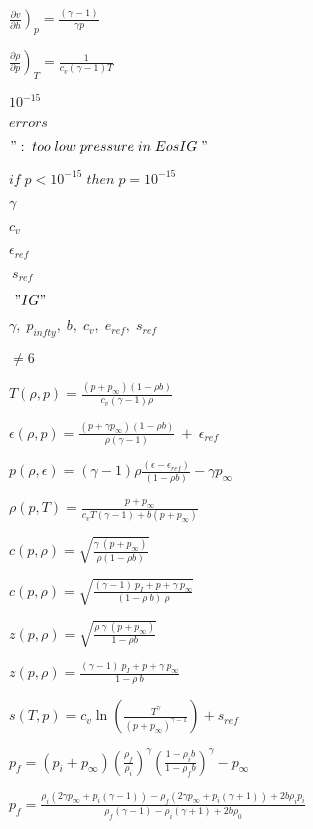 \documentclass{article}
\begin{document}
$ \left. \frac{\partial v}{\partial h} \right)_p =  \frac{(\gamma-1)}{\gamma p} $
\pagebreak

$ \left. \frac{\partial \rho}{\partial p} \right)_T = \frac{1}{c_v (\gamma - 1) T} $
\pagebreak

$ 10^{-15} $
\pagebreak

$ errors $
\pagebreak

$ " :\;too\;low\;pressure \;in\; EosIG\;"$
\pagebreak

$ if \; p < 10^{-15} \; then \;  p= 10^{-15} $
\pagebreak

$ \gamma $
\pagebreak

$ c_v $
\pagebreak

$ \epsilon_{ref} $
\pagebreak

$ \ s_{ref} $
\pagebreak

$ \ "IG" $
\pagebreak

$ \gamma, \; p_{infty}, \; b, \; c_v, \; e_{ref}, \; s_{ref}$
\pagebreak

$ \neq 6$
\pagebreak

$  T(\rho, p) = \frac{(p+p_{\infty})(1-\rho b)}{c_v (\gamma-1)\rho} $
\pagebreak

$  \epsilon (\rho, p)  = \frac{(p + \gamma p_{\infty})(1-\rho b)}{\rho (\gamma-1)} \ + \ \epsilon_{ref} $
\pagebreak

$  p(\rho, \epsilon)  = (\gamma-1)\rho \frac{(\epsilon - \epsilon_{ref})}{(1-\rho b)} - \gamma p_{\infty} $
\pagebreak

$  \rho(p, T)  =  \frac{p + p_{\infty} }{c_v T(\gamma-1) + b (p + p_{\infty})} $
\pagebreak

$  c(p, \rho)  = \sqrt{  \frac{\gamma \ (p+p_{\infty})}{\rho (1-\rho b)}} $
\pagebreak

$  c(p, \rho)  = \sqrt{  \frac{(\gamma-1) \ p_I + p + \gamma \ p_{\infty}}{(1 - \rho \ b) \ \rho}} $
\pagebreak

$  z(p, \rho)  = \sqrt{ \frac{\rho \ \gamma \ (p+p_{\infty})}{1-\rho b} } $
\pagebreak

$  z(p, \rho)  = \frac{(\gamma-1) \ p_I + p + \gamma \ p_{\infty}}{1 - \rho \ b} $
\pagebreak

$  s(T, p)  = c_v \ln \left( \frac{T^\gamma}  { (p+p_{\infty})^{\gamma-1} } \right)+s_{ref} $
\pagebreak

$ p_f = (p_i+p_{\infty}) \left( \frac{\rho_f}{\rho_i} \right)^\gamma \left(\frac{1-\rho_i b}{1-\rho_f b}\right)^\gamma -p_{\infty} $
\pagebreak

$ p_f = \frac{\rho_i\left(2\gamma p_{\infty}+p_i (\gamma-1)\right)-\rho_f \left(2\gamma p_{\infty}+p_i (\gamma +1)\right)+2b\rho_i p_i}{\rho_f (\gamma-1)-\rho_i (\gamma+1)+2b\rho_0} $
\pagebreak
\end{document}
